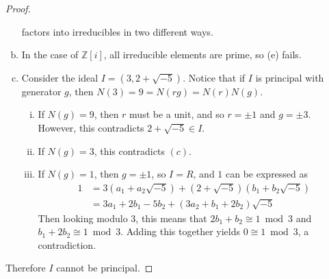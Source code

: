 \documentclass{article}
\begin{document}
\begin{proof}
\begin{enumerate}[(a)]
    factors into irreducibles in two different ways.
    \item In the case of $\mathbb Z[i]$, all irreducible elements are prime, so
      (e) fails.
    \item Consider the ideal $I = (3, 2 + \sqrt{-5})$. Notice that if $I$ is
    principal with generator $g$, then $N(3) = 9 = N(rg) = N(r)N(g)$.
    \begin{enumerate}[(i)]
      \item If $N(g) = 9$, then $r$ must be a unit, and so $r = \pm 1$ and
      $g = \pm 3$. However, this contradicts $2 + \sqrt{-5} \in I$.
      \item If $N(g) = 3$, this contradicts $(c)$.
      \item If $N(g) = 1$, then $g = \pm 1$, so $I = R$, and $1$ can
      be expressed as \begin{align*}
        1 &= 3(a_1 + a_2\sqrt{-5}) + (2 + \sqrt{-5})(b_1 + b_2\sqrt{-5}) \\
        &= 3a_1 + 2b_1 - 5b_2 + (3a_2 + b_1 + 2b_2) \sqrt{-5}
      \end{align*}
      Then looking modulo $3$, this means that
      $2b_1 + b_2 \cong 1 \bmod 3$ and $b_1 + 2b_2 \cong 1 \bmod 3$. Adding this
      together yields $0 \cong 1 \bmod 3$, a contradiction.
    \end{enumerate}
  \end{enumerate}
  Therefore $I$ cannot be principal.
\end{proof}
\end{document}
